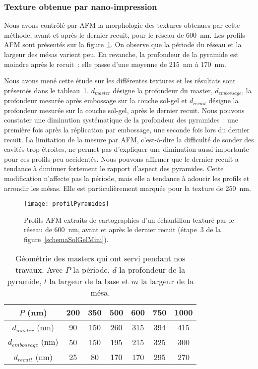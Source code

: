 	\subsubsection{Texture obtenue par nano-impression}
Nous avons contrôlé par AFM la morphologie des textures obtenues par cette méthode, avant et après le dernier recuit, pour le réseau de 600~nm. Les profils AFM sont présentés sur la figure~\ref{profilPyramides}. On observe que la période du réseau et la largeur des mésas varient peu. En revanche, la profondeur de la pyramide est moindre après le recuit~: elle passe d'une moyenne de 215~nm à 170~nm.\par 
Nous avons mené cette étude sur les différentes textures et les résultats sont présentés dans le tableau~\ref{tPerteRecuit}. $d_{master}$ désigne la profondeur du master, $d_{embossage}$, la profondeur mesurée après embossage sur la couche sol-gel et $d_{recuit}$ désigne la profondeur mesurée sur la couche sol-gel, après le dernier recuit. Nous pouvons constater une diminution systématique de la profondeur des pyramides~: une première fois après la réplication par embossage, une seconde fois lors du dernier recuit. La limitation de la mesure par AFM, c'est-à-dire la difficulté de sonder des cavités trop étroites, ne permet pas d'expliquer une diminution aussi importante pour ces profils peu accidentés. Nous pouvons affirmer que le dernier recuit a tendance à diminuer fortement le rapport d'aspect des pyramides. Cette modification n'affecte pas la période, mais elle a tendance à adoucir les profils et arrondir les mésas. Elle est particulièrement marquée pour la texture de 250~nm.\par 
\begin{figure}[!htb]
\centering
\texttt{[image: profilPyramides]}
\caption{Profils AFM extraits de cartographies d'un échantillon texturé par le réseau de 600~nm, avant et après le dernier recuit (étape~3 de la figure~\ref{schemaSolGelMini}).}
\label{profilPyramides}
\end{figure}
\begin{table}[!htb]
\centering
\begin{tabular}{ccccccc}
\hline
$P$ (nm) & 200 & 350 & 500 & 600 & 750 & 1000\\
\hline
$d_{master}$ (nm) & 90 & 150 & 260 & 315 & 394 & 415\\
$d_{embossage}$ (nm) & 50 & 150 & 195 & 215 & 325 & 300\\
$d_{recuit}$ (nm) & 25 & 80 & 170 & 170 & 295 & 270\\
\hline
\end{tabular}
\caption{Géométrie des masters qui ont servi pendant nos travaux. Avec $P$ la période, $d$ la profondeur de la pyramide, $l$ la largeur de la base et $m$ la largeur de la mésa.}
\label{tPerteRecuit}
\end{table}
